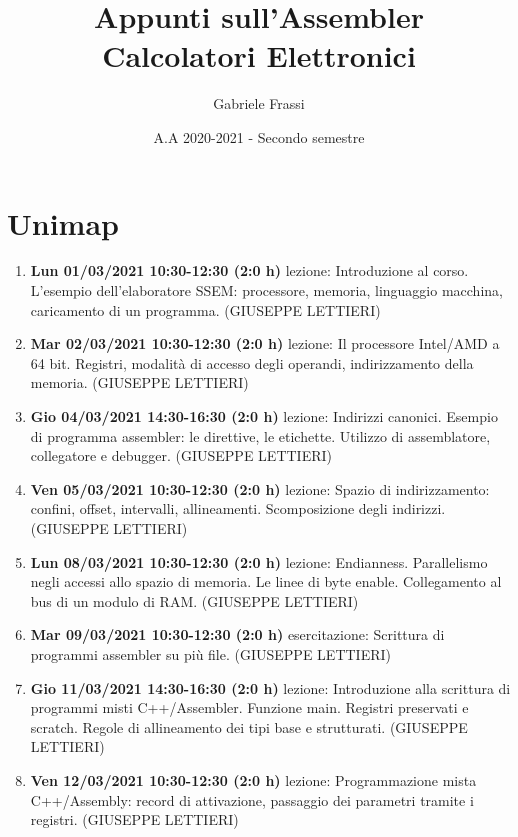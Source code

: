 \documentclass[11pt]{report}
\theoremstyle{definition}
\begin{document}
\renewcommand{\contentsname}{Indice degli appunti}
\title{\textbf{Appunti sull'Assembler}\\Calcolatori Elettronici}
\author{Gabriele Frassi}
\date{A.A 2020-2021 - Secondo semestre}
\maketitle


\small\tableofcontents\normalsize

\chapter{Unimap} 
\small

\begin{enumerate}
\item \textbf{Lun 01/03/2021 10:30-12:30 (2:0 h)} lezione: Introduzione al corso. L'esempio dell'elaboratore SSEM: processore, memoria, linguaggio macchina, caricamento di un programma. (GIUSEPPE LETTIERI)
\item \textbf{Mar 02/03/2021 10:30-12:30 (2:0 h)} lezione: Il processore Intel/AMD a 64 bit. Registri, modalità di accesso degli operandi, indirizzamento della memoria. (GIUSEPPE LETTIERI)
\item \textbf{Gio 04/03/2021 14:30-16:30 (2:0 h)} lezione: Indirizzi canonici. Esempio di programma assembler: le direttive, le etichette. Utilizzo di assemblatore, collegatore e debugger. (GIUSEPPE LETTIERI)
\item \textbf{Ven 05/03/2021 10:30-12:30 (2:0 h)} lezione: Spazio di indirizzamento: confini, offset, intervalli, allineamenti. Scomposizione degli indirizzi. (GIUSEPPE LETTIERI)
\item \textbf{Lun 08/03/2021 10:30-12:30 (2:0 h)} lezione: Endianness. Parallelismo negli accessi allo spazio di memoria. Le linee di byte enable. Collegamento al bus di un modulo di RAM. (GIUSEPPE LETTIERI)
\item \textbf{Mar 09/03/2021 10:30-12:30 (2:0 h)} esercitazione: Scrittura di programmi assembler su più file. (GIUSEPPE LETTIERI)
\item \textbf{Gio 11/03/2021 14:30-16:30 (2:0 h)} lezione: Introduzione alla scrittura di programmi misti C++/Assembler. Funzione main. Registri preservati e scratch. Regole di allineamento dei tipi base e strutturati. (GIUSEPPE LETTIERI)
\item \textbf{Ven 12/03/2021 10:30-12:30 (2:0 h)} lezione: Programmazione mista C++/Assembly: record di attivazione, passaggio dei parametri tramite i registri. (GIUSEPPE LETTIERI)

\end{enumerate}
\end{document}
